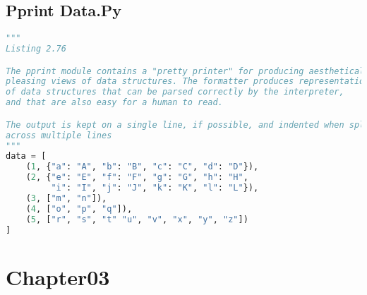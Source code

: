 \documentclass[a4paper,landscape]{report}
\begin{document}
\section{Pprint Data.Py}
\begin{lstlisting}[language=Python]
"""
Listing 2.76

The pprint module contains a "pretty printer" for producing aesthetically
pleasing views of data structures. The formatter produces representations
of data structures that can be parsed correctly by the interpreter,
and that are also easy for a human to read.

The output is kept on a single line, if possible, and indented when split
across multiple lines
"""
data = [
    (1, {"a": "A", "b": "B", "c": "C", "d": "D"}),
    (2, {"e": "E", "f": "F", "g": "G", "h": "H",
         "i": "I", "j": "J", "k": "K", "l": "L"}),
    (3, ["m", "n"]),
    (4, ["o", "p", "q"]),
    (5, ["r", "s", "t" "u", "v", "x", "y", "z"])
]

\end{lstlisting}
\chapter{Chapter03}
\end{document}

